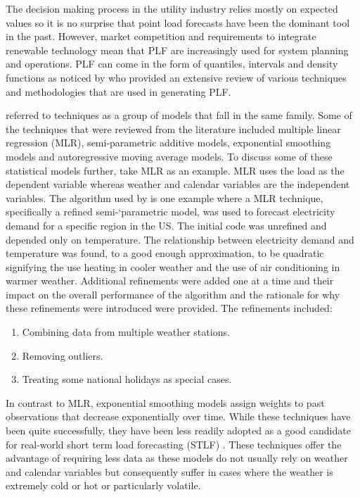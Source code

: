 \documentclass[a4paper]{article}
\begin{document}
The decision making process in the utility industry relies mostly on expected values so it is no surprise that point load forecasts have been the dominant tool in the past. However, market competition and requirements to integrate renewable technology mean that PLF are increasingly used for system planning and operations. PLF can come in the form of quantiles, intervals and density functions as noticed by \cite{hong16} who provided an extensive review of various techniques and methodologies that are used in generating PLF. 

\cite{hong16} referred to techniques as a group of models that fall in the same family. Some of the techniques that were reviewed from the literature included multiple linear regression (MLR), semi-parametric additive models, exponential smoothing models and autoregressive moving average models. To discuss some of these statistical models further, take MLR as an example. MLR uses the load as the dependent variable whereas weather and calendar variables are the independent variables. The algorithm used by \cite{char14} is one example where a MLR technique, specifically a refined semi-`parametric model, was used to forecast electricity demand for a specific region in the US. The initial code was unrefined and depended only on temperature. The relationship between electricity demand and temperature was found, to a good enough approximation, to be quadratic signifying the use heating in cooler weather and the use of air conditioning in warmer weather. Additional refinements were added one at a time and their impact on the overall performance of the algorithm and the rationale for why these refinements were introduced were provided. The refinements included:
\begin{enumerate}
\item Combining data from multiple weather stations.
\item Removing outliers.
\item Treating some national holidays as special cases.
\end{enumerate}

In contrast to MLR, exponential smoothing models assign weights to past observations that decrease exponentially over time. While these techniques have been quite successfully, they have been less readily adopted as a good candidate for real-world short term load forecasting (STLF) \citep{hong16}. These techniques offer the advantage of requiring less data as these models do not usually rely on weather and calendar variables but consequently suffer in cases where the weather is extremely cold or hot or particularly volatile.
\end{document}
